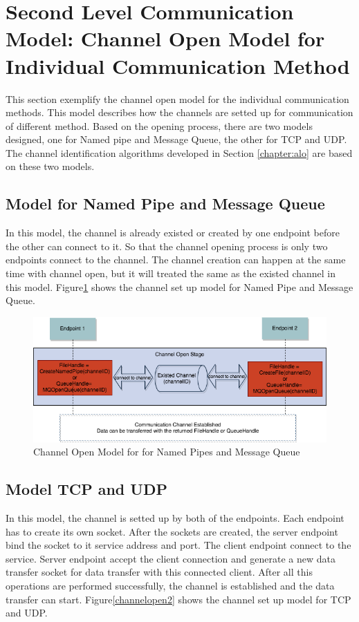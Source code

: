 \section{Second Level Communication Model: Channel Open Model for Individual Communication Method}    
This section exemplify the channel open model for the individual communication methods. This model describes how the channels are setted up for communication of different method. Based on the opening process, there are two models designed, one for Named pipe and Message Queue, the other for TCP and UDP. The channel identification algorithms developed in Section \ref{chapter:alo} are based on these two models.
\subsection{Model for Named Pipe and Message Queue}
In this model, the channel is already existed or created by one endpoint before the other can connect to it. So that the channel opening process is only two endpoints connect to the channel. The channel creation can happen at the same time with channel open, but it will treated the same as the existed channel in this model. Figure\ref{channelopen1} shows the channel set up model for Named Pipe and Message Queue.

\begin{figure}[H]
\centerline{\includegraphics[scale=0.55]{Figures/channelopen1}}
 \caption{Channel Open Model for  for Named Pipes and Message Queue}
\label{channelopen1}
\end{figure}

\subsection{Model TCP and UDP}
In this model, the channel is setted up by both of the endpoints. Each endpoint has to create its own socket. After the sockets are created, the server endpoint bind the socket to it service address and port. The client endpoint connect to the service. Server endpoint accept the client connection and generate a new data transfer socket for data transfer with this connected client. After all this operations are performed successfully, the channel is established and the data transfer can start. Figure\ref{channelopen2} shows the channel set up model for TCP and UDP.


